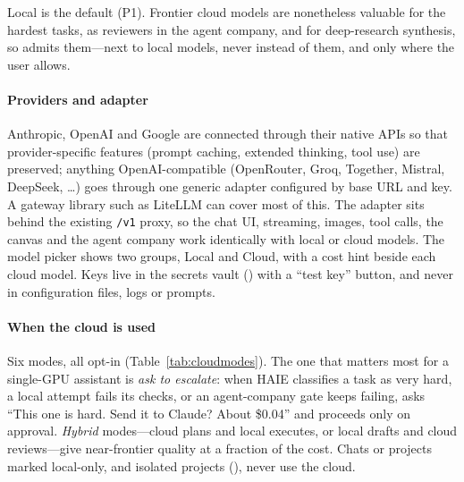 Local is the default (P1). Frontier cloud models are nonetheless valuable for the hardest tasks, as reviewers in the agent company, and for deep-research synthesis, so \hivi{} admits them---next to local models, never instead of them, and only where the user allows.

\paragraph{Providers and adapter} Anthropic, OpenAI and Google are connected through their native APIs so that provider-specific features (prompt caching, extended thinking, tool use) are preserved; anything OpenAI-compatible (OpenRouter, Groq, Together, Mistral, DeepSeek, \dots) goes through one generic adapter configured by base URL and key. A gateway library such as LiteLLM can cover most of this. The adapter sits behind the existing \texttt{/v1} proxy, so the chat UI, streaming, images, tool calls, the canvas and the agent company work identically with local or cloud models. The model picker shows two groups, Local and Cloud, with a cost hint beside each cloud model. Keys live in the secrets vault () with a ``test key'' button, and never in configuration files, logs or prompts.

\paragraph{When the cloud is used} Six modes, all opt-in (Table~\ref{tab:cloudmodes}). The one that matters most for a single-GPU assistant is \emph{ask to escalate}: when HAIE classifies a task as very hard, a local attempt fails its checks, or an agent-company gate keeps failing, \hivi{} asks ``This one is hard. Send it to Claude? About \$0.04'' and proceeds only on approval. \emph{Hybrid} modes---cloud plans and local executes, or local drafts and cloud reviews---give near-frontier quality at a fraction of the cost. Chats or projects marked local-only, and isolated projects (), never use the cloud.

